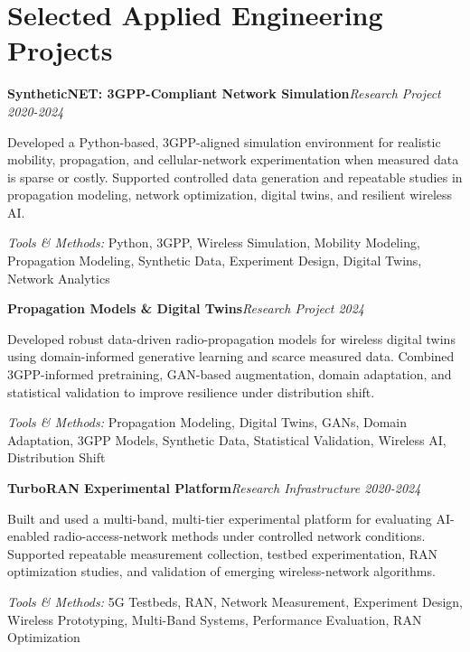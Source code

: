\documentclass[9pt,letterpaper]{extarticle}
\newcommand{\entry}[2]{\Needspace{4\baselineskip}\textbf{#1}\hfill\textit{#2}\par}
\begin{document}
\section{Selected Applied Engineering Projects}
\entry{SyntheticNET: 3GPP-Compliant Network Simulation}{Research Project \textbar{} 2020-2024}
Developed a Python-based, 3GPP-aligned simulation environment for realistic mobility, propagation, and cellular-network experimentation when measured data is sparse or costly. Supported controlled data generation and repeatable studies in propagation modeling, network optimization, digital twins, and resilient wireless AI.\par
{\small\textit{Tools \& Methods:} Python, 3GPP, Wireless Simulation, Mobility Modeling, Propagation Modeling, Synthetic Data, Experiment Design, Digital Twins, Network Analytics\par}
\vspace{1pt}
\entry{Propagation Models \& Digital Twins}{Research Project \textbar{} 2024}
Developed robust data-driven radio-propagation models for wireless digital twins using domain-informed generative learning and scarce measured data. Combined 3GPP-informed pretraining, GAN-based augmentation, domain adaptation, and statistical validation to improve resilience under distribution shift.\par
{\small\textit{Tools \& Methods:} Propagation Modeling, Digital Twins, GANs, Domain Adaptation, 3GPP Models, Synthetic Data, Statistical Validation, Wireless AI, Distribution Shift\par}
\vspace{1pt}
\entry{TurboRAN Experimental Platform}{Research Infrastructure \textbar{} 2020-2024}
Built and used a multi-band, multi-tier experimental platform for evaluating AI-enabled radio-access-network methods under controlled network conditions. Supported repeatable measurement collection, testbed experimentation, RAN optimization studies, and validation of emerging wireless-network algorithms.\par
{\small\textit{Tools \& Methods:} 5G Testbeds, RAN, Network Measurement, Experiment Design, Wireless Prototyping, Multi-Band Systems, Performance Evaluation, RAN Optimization\par}
\vspace{1pt}
\end{document}
